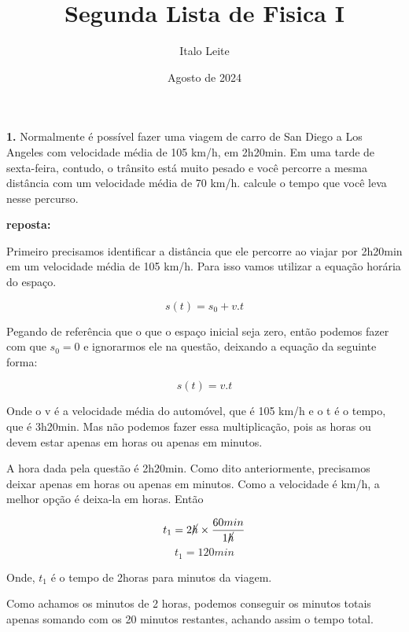 \documentclass[a4paper, 12pt]{article}
\title{Segunda Lista de Fisica I}
\author{Italo Leite}
\date{Agosto de 2024}
\begin{document}
	
	\maketitle
	
	\begin{flushleft}
		\textbf{1. } Normalmente é possível fazer uma viagem de carro de San Diego a Los Angeles com velocidade média de 105 km/h, em 2h20min. Em uma tarde de sexta-feira, contudo, o trânsito está muito pesado e você percorre a mesma distância com um velocidade média de 70 km/h. calcule o tempo que você leva nesse percurso.
		
		\textbf{reposta:}
		
		Primeiro precisamos identificar a distância que ele percorre ao viajar por 2h20min em um velocidade média de 105 km/h. Para isso vamos utilizar a equação horária do espaço.
		
		\begin{equation*}
			s(t) = s_0 + v.t
		\end{equation*}
		
		Pegando de referência que o que o espaço inicial seja zero, então podemos fazer com que $s_0 = 0$ e ignorarmos ele na questão, deixando a equação da seguinte forma:
		
		\begin{equation*}
			s(t) = v.t
		\end{equation*}
		
		Onde o v é a velocidade média do automóvel, que é 105 km/h e o t é o tempo, que é 3h20min. Mas não podemos fazer essa multiplicação, pois as horas ou devem estar apenas em horas ou apenas em minutos.
		
		A hora dada pela questão é 2h20min. Como dito anteriormente, precisamos deixar apenas em horas ou apenas em minutos. Como a velocidade é km/h, a melhor opção é deixa-la em horas. Então
		
		\begin{equation*}
			t_1=2 \cancel{h} \times \frac{60 min}{1 \cancel{h}} 
		\end{equation*}
		\begin{equation*}
			t_1 = 120 min 
		\end{equation*}
		
		Onde, $t_1$ é o tempo de 2horas para minutos da viagem.
		
		Como achamos os minutos de 2 horas, podemos conseguir os minutos totais apenas somando com os 20 minutos restantes, achando assim o tempo total.
		

\end{flushleft}
\end{document}
